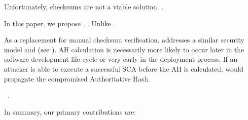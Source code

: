 







Unfortunately, checksums are not a viable solution. .

In this paper, we propose \SYSTEM{}, . Unlike .

As a replacement for manual checksum verification, \SYSTEM{} addresses a similar
security model and   (see ). AH calculation is necessarily more
likely to occur later in the software development life cycle or very early in
the deployment process. If an attacker is able to execute a successful SCA
before the AH is calculated, \SYSTEM{} would propagate the compromised
Authoritative Hash.

~\cite{DNSSEC}.


In summary, our primary contributions are:

